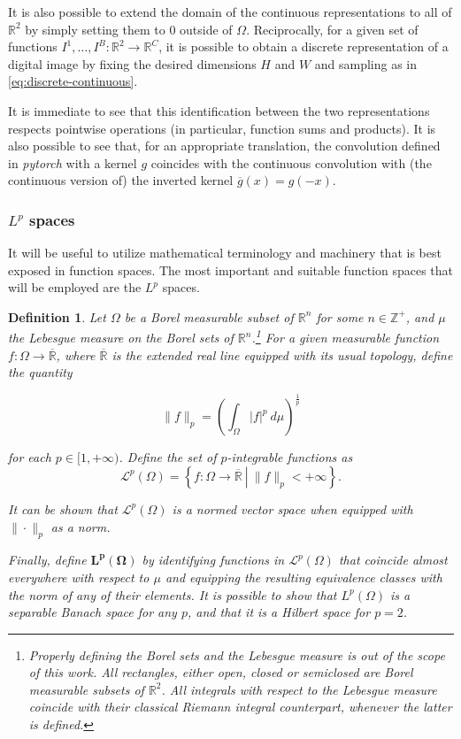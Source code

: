 \documentclass[twocolumn,twoside,a4paper,10pt]{IEEEtran}
\newtheorem{definition}{Definition}
\begin{document}
It is also possible to extend the domain of the continuous representations to all of \(\mathbb{R}^2\) by simply setting them to \(0\) outside of \(\Omega\). Reciprocally, for a given set of functions \(I^1, \dots, I^B\colon \mathbb{R}^2\to \mathbb{R}^C\), it is possible to obtain a discrete representation of a digital image by fixing the desired dimensions \(H\) and \(W\) and sampling as in \cref{eq:discrete-continuous}.

It is immediate to see that this identification between the two representations respects pointwise operations (in particular, function sums and products). It is also possible to see that, for an appropriate translation, the convolution defined in \textit{pytorch} with a kernel \(g\) coincides with the continuous convolution with (the continuous version of) the inverted kernel \(\overline{g}(x) = g(-x)\).

\subsubsection{\(L^p\) spaces}
It will be useful to utilize mathematical terminology and machinery that is best exposed in function spaces. The most important and suitable function spaces that will be employed are the \(L^p\) spaces.

\begin{definition}
  Let \(\Omega\) be a Borel measurable subset of \(\mathbb{R}^n\) for some \(n\in \mathbb{Z}^+\), and \(\mu\) the Lebesgue measure on the Borel sets of \(\mathbb{R}^n\).\footnote{Properly defining the Borel sets and the Lebesgue measure is out of the scope of this work. All rectangles, either open, closed or semiclosed are Borel measurable subsets of \(\mathbb{R}^2\). All integrals with respect to the Lebesgue measure coincide with their classical Riemann integral counterpart, whenever the latter is defined.} For a given measurable function \(f\colon \Omega\to \overline{\mathbb{R}}\), where \(\overline{\mathbb{R}}\) is the extended real line equipped with its usual topology, define the quantity

  \[
    \|f\|_{p} = \left(\int_{\Omega}|f|^p~d\mu\right)^{\frac 1p}
  \]

  for each \(p\in[1, +\infty)\). Define the set of \(p\)-integrable functions as
  \[
    \mathcal{L}^p(\Omega) = \left\{f\colon\Omega\to \mathbb{\overline{R}}~\left|~\|f\|_{p}<+\infty\right.\right\}
  .\]

  It can be shown that \(\mathcal{L}^p(\Omega)\) is a normed vector space when equipped with \(\|\cdot\|_{p}\) as a norm.

  Finally, define \(\bm{L^p(\Omega)}\) by identifying functions in \(\mathcal{L}^p(\Omega)\) that coincide almost everywhere with respect to \(\mu\) and equipping the resulting equivalence classes with the norm of any of their elements. It is possible to show that \(L^p(\Omega)\) is a separable Banach space for any \(p\), and that it is a Hilbert space for \(p=2\).
\end{definition}
\end{document}
